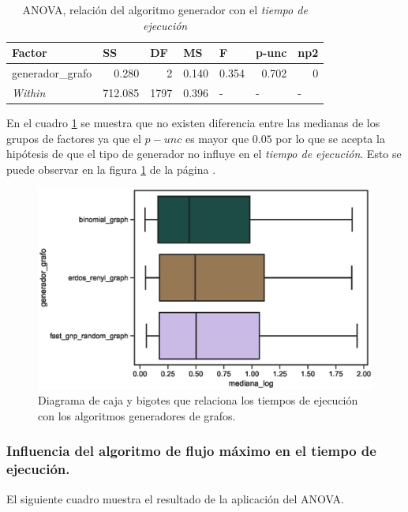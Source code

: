 \documentclass{article}
\begin{document}
\begin{table}[htbp]
  \centering
  \caption{ANOVA, relación del algoritmo generador con el \textit{tiempo de ejecución}}
    \begin{tabular}{lrrrlll}
    \toprule
    \textbf{Factor} & \multicolumn{1}{l}{\textbf{SS}} & \multicolumn{1}{l}{\textbf{DF}} & \multicolumn{1}{l}{\textbf{MS}} & \textbf{F} & \textbf{p-unc} & \textbf{np2} \\
    \midrule
    generador\_grafo & 0.280 & 2     & 0.140 & \multicolumn{1}{r}{0.354} & \multicolumn{1}{r}{0.702} & \multicolumn{1}{r}{0} \\
    \textit{Within} & 712.085 & 1797  & 0.396 & -     & -     & - \\
    \bottomrule
    \end{tabular}%
  \label{tab:t2}%
\end{table}%
En el cuadro \ref{tab:t2} se muestra que no existen diferencia entre las medianas de los grupos de factores ya que el $p-unc$ es mayor que $0.05$ por lo que se acepta la hipótesis de que el tipo de generador no influye en el \textit{tiempo de ejecución}. Esto se puede observar en la figura \ref{fig4} de la página \pageref{fig4}. 

\newpage
\begin{center}
\begin{figure}[htbp]
\includegraphics[scale=0.6]{boxplotgeneradorgrafo.eps}
\caption{Diagrama de caja y bigotes que relaciona los tiempos de ejecución con los algoritmos generadores de grafos.}
\label{fig4}
\end{figure}
\end{center}
\subsubsection{Influencia del algoritmo de flujo máximo en el tiempo de ejecución.}
El siguiente cuadro muestra el resultado de la aplicación del ANOVA.
\end{document}
